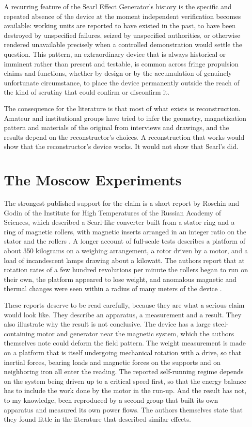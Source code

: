 \documentclass[11pt]{article}
\begin{document}
A recurring feature of the Searl Effect Generator's history is the specific and repeated absence of the device at the moment independent verification becomes available: working units are reported to have existed in the past, to have been destroyed by unspecified failures, seized by unspecified authorities, or otherwise rendered unavailable precisely when a controlled demonstration would settle the question. This pattern, an extraordinary device that is always historical or imminent rather than present and testable, is common across fringe propulsion claims and functions, whether by design or by the accumulation of genuinely unfortunate circumstance, to place the device permanently outside the reach of the kind of scrutiny that could confirm or disconfirm it.

The consequence for the literature is that most of what exists is reconstruction. Amateur and institutional groups have tried to infer the geometry, magnetization pattern and materials of the original from interviews and drawings, and the results depend on the reconstructor's choices. A reconstruction that works would show that the reconstructor's device works. It would not show that Searl's did.

\section{The Moscow Experiments}

The strongest published support for the claim is a short report by Roschin and Godin of the Institute for High Temperatures of the Russian Academy of Sciences, which described a Searl-like converter built from a stator ring and a ring of magnetic rollers, with magnetic inserts arranged in an integer ratio on the stator and the rollers \cite{RG2000}. A longer account of full-scale tests describes a platform of about 350 kilograms on a weighing arrangement, a rotor driven by a motor, and a load of incandescent lamps drawing about a kilowatt. The authors report that at rotation rates of a few hundred revolutions per minute the rollers began to run on their own, the platform appeared to lose weight, and anomalous magnetic and thermal changes were seen within a radius of many meters of the device \cite{RG2001}.

These reports deserve to be read carefully, because they are what a serious claim would look like. They describe an apparatus, a measurement and a result. They also illustrate why the result is not conclusive. The device has a large steel-containing motor and generator near the magnetic system, which the authors themselves note could deform the field pattern. The weight measurement is made on a platform that is itself undergoing mechanical rotation with a drive, so that inertial forces, bearing loads and magnetic forces on the supports and on neighboring iron all enter the reading. The reported self-running regime depends on the system being driven up to a critical speed first, so that the energy balance has to include the work done by the motor in the run-up. And the result has not, to my knowledge, been reproduced by a second group that built its own apparatus and measured its own power flows. The authors themselves state that they found little in the literature that described similar effects.
\end{document}
